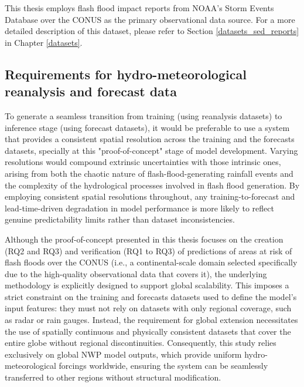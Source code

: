 This thesis employs flash flood impact reports from NOAA's Storm Events Database over the CONUS as the primary observational data source. For a more detailed description of this dataset, please refer to Section \ref{datasets_sed_reports} in Chapter \ref{datasets}.


\subsection{Requirements for hydro-meteorological reanalysis and forecast data}

To  generate a seamless transition from training (using reanalysis datasets) to inference stage (using forecast datasets), it would be preferable to use a system that provides a consistent spatial resolution across the training and the forecasts datasets, specially at this "proof-of-concept" stage of model development. Varying resolutions would compound extrinsic uncertainties with those intrinsic ones, arising from both the chaotic nature of flash-flood-generating rainfall events and the complexity of the hydrological processes involved in flash flood generation. By employing consistent spatial resolutions throughout, any training-to-forecast and lead-time-driven degradation in model performance is more likely to reflect genuine predictability limits rather than dataset inconsistencies.

Although  the proof-of-concept presented in this thesis focuses on the creation (RQ2 and RQ3) and verification (RQ1 to RQ3) of predictions of areas at risk of flash floods over the CONUS (i.e., a continental-scale domain selected specifically due to the high-quality observational data that covers it), the underlying methodology is explicitly designed to support global scalability. This imposes a strict constraint on the training and forecasts datasets used to define the model's input features: they must not rely on datasets with only regional coverage, such as radar or rain gauges. Instead, the requirement for global extension necessitates the use of spatially continuous and physically consistent datasets that cover the entire globe without regional discontinuities. Consequently, this study relies exclusively on global NWP model outputs, which provide uniform hydro-meteorological forcings worldwide, ensuring the system can be seamlessly transferred to other regions without structural modification.

